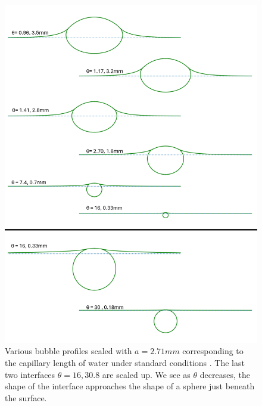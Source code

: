 \begin{figure}
    \centering    \includegraphics[width=0.95\linewidth]{WriteUp/images/Bubble profiles.png}
    \caption{Various bubble profiles scaled with $a=2.71mm$ corresponding to the capillary length of water under standard conditions \cite{rapp2016microfluidics}. The last two interfaces $\theta=16,30.8$ are scaled up. We see as $\theta$ decreases, the shape of the interface approaches the shape of a sphere just beneath the surface.}
    \label{fig:11}
\end{figure}
